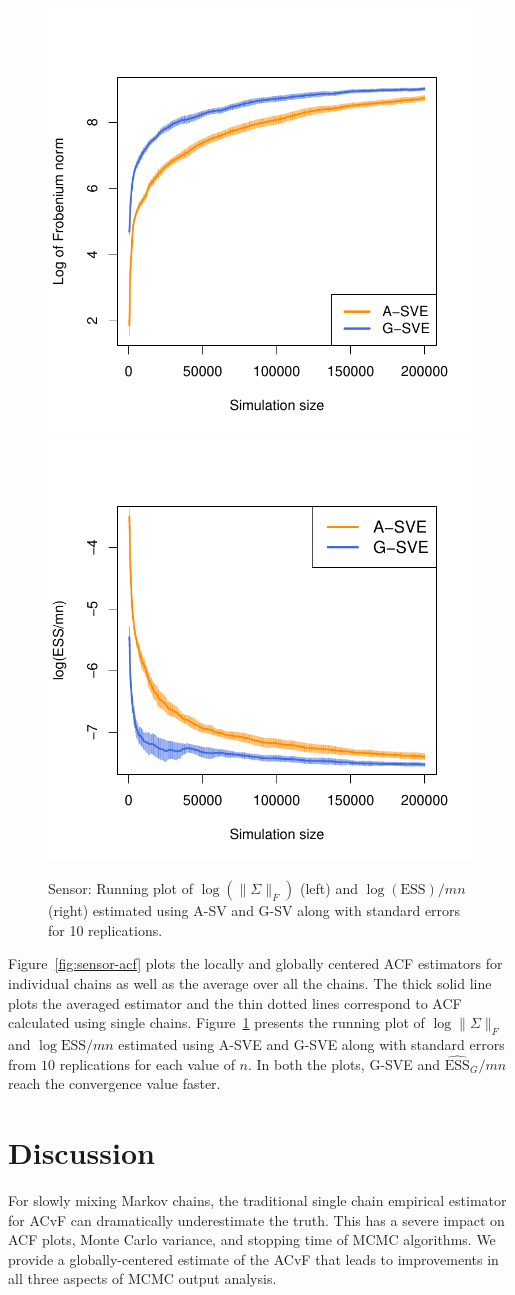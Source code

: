\documentclass[11pt]{article}
\theoremstyle{remark}
\begin{document}
\begin{figure}
    \centering
      \includegraphics[width = .30\textwidth]{plots/sensor-frob.pdf} 
      \includegraphics[width = .30\textwidth]{plots/sensor-ess.pdf}

    \caption{Sensor: Running plot of $\log (\|{\Sigma}\|_F)$ (left) and $\log ({\textrm{ESS}})/mn$ (right) estimated using A-SV and G-SV along with standard errors for 10 replications.}
    \label{fig:sensor-frob_n_ess}
\end{figure}

Figure~\ref{fig:sensor-acf} plots the locally and globally centered ACF estimators for individual chains  as well as the average over all the chains. The thick solid line plots the averaged estimator and the thin dotted lines correspond to ACF calculated using single chains. Figure~\ref{fig:sensor-frob_n_ess} presents the running plot of $\log \|{\Sigma}\|_F$ and $\log \textrm{ESS}/mn$ estimated using A-SVE and G-SVE along with standard errors from $10$ replications for each value of $n$. In both the plots, G-SVE and $\widehat{\textrm{ESS}}_G/mn$ reach the convergence value faster.

 
\section{Discussion} \label{sec:discussion}



For slowly mixing Markov chains, the traditional single chain empirical estimator for ACvF can dramatically underestimate the truth. This has a severe impact on ACF plots, Monte Carlo variance, and stopping time of MCMC algorithms. We provide a globally-centered estimate of the ACvF that leads to improvements in all three aspects of MCMC output analysis.
\end{document}

